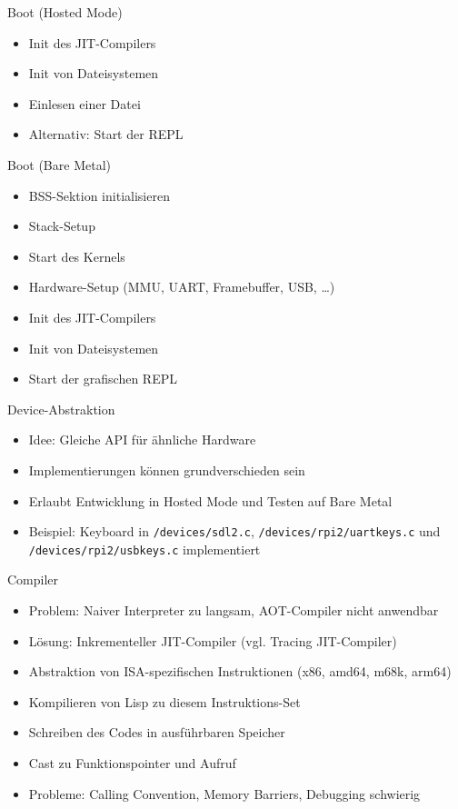\documentclass[presentation]{beamer}
\begin{document}
\begin{frame}[label=sec-2-5]{Boot (Hosted Mode)}
\begin{itemize}
\item Init des JIT-Compilers
\item Init von Dateisystemen
\item Einlesen einer Datei
\item Alternativ: Start der REPL
\end{itemize}
\end{frame}

\begin{frame}[label=sec-2-6]{Boot (Bare Metal)}
\begin{itemize}
\item BSS-Sektion initialisieren
\item Stack-Setup
\item Start des Kernels
\item Hardware-Setup (MMU, UART, Framebuffer, USB, \ldots{})
\item Init des JIT-Compilers
\item Init von Dateisystemen
\item Start der grafischen REPL
\end{itemize}
\end{frame}

\begin{frame}[fragile,label=sec-2-7]{Device-Abstraktion}
 \begin{itemize}
\item Idee: Gleiche API für ähnliche Hardware
\item Implementierungen können grundverschieden sein
\item Erlaubt Entwicklung in Hosted Mode und Testen auf Bare Metal
\item Beispiel: Keyboard in \texttt{/devices/sdl2.c}, \texttt{/devices/rpi2/uartkeys.c}
  und \texttt{/devices/rpi2/usbkeys.c} implementiert
\end{itemize}
\end{frame}

\begin{frame}[label=sec-2-8]{Compiler}
\begin{itemize}
\item Problem: Naiver Interpreter zu langsam, AOT-Compiler nicht anwendbar
\item Lösung: Inkrementeller JIT-Compiler (vgl. Tracing JIT-Compiler)
\item Abstraktion von ISA-spezifischen Instruktionen (x86, amd64, m68k, arm64)
\item Kompilieren von Lisp zu diesem Instruktions-Set
\item Schreiben des Codes in ausführbaren Speicher
\item Cast zu Funktionspointer und Aufruf
\item Probleme: Calling Convention, Memory Barriers, Debugging schwierig
\end{itemize}
\end{frame}
\end{document}
